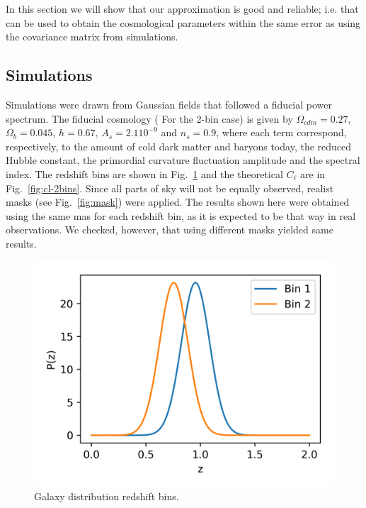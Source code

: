 \documentclass[a4paper,11pt]{article}
\newcommand{\cl}{C_\ell}
\newcommand{\red}[1]{{\color{red} #1}}
\begin{document}
In this section we will show that our approximation is good and reliable; i.e.
that can be used to obtain the cosmological parameters within the same error
as using the covariance matrix from simulations. 

\subsection{Simulations}

Simulations were drawn from Gaussian fields that followed a fiducial power
spectrum. The fiducial cosmology (\red{For the 2-bin case}) is given by
$\Omega_{cdm} = 0.27$, $\Omega_b = 0.045$, $h = 0.67$, $A_s = 2.1 10^{-9}$ and
$n_s = 0.9$, where each term correspond, respectively, to the amount of cold
dark matter and baryons today, the reduced Hubble constant, the primordial
curvature fluctuation amplitude and the spectral index. The redshift bins are
shown in Fig.~\ref{fig:pz} and the theoretical $\cl$ are in
Fig.~\ref{fig:cl-2bins}. Since all parts of sky will not be equally observed,
realist masks (see Fig.~\ref{fig:mask}) were applied.  The results shown here
were obtained using the same mas for each redshift bin, as it is expected to
be that way in real observations. We checked, however, that using different
masks yielded same results. 

\begin{figure}
  \centering
  \includegraphics[width=\columnwidth]{./figures/pz.png}
  \caption{Galaxy distribution redshift bins.}
  \label{fig:pz}
\end{figure}
\end{document}
